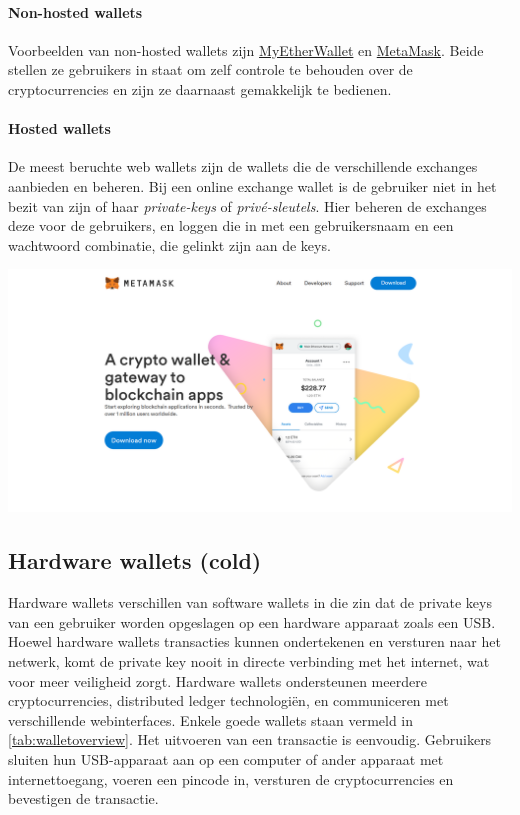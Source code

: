 \paragraph{Non-hosted wallets}
Voorbeelden van non-hosted wallets zijn \href{https://www.myetherwallet.com}{MyEtherWallet} en \href{https://www.metamask.io}{MetaMask}. Beide stellen ze gebruikers in staat om zelf controle te behouden over de cryptocurrencies en zijn ze daarnaast gemakkelijk te bedienen.

\paragraph{Hosted wallets}
De meest beruchte web wallets zijn de wallets die de verschillende exchanges aanbieden en beheren. Bij een online exchange wallet is de gebruiker niet in het bezit van zijn of haar \emph{private-keys} of \emph{priv{\'e}-sleutels}. Hier beheren de exchanges deze voor de gebruikers, en loggen die in met een gebruikersnaam en een wachtwoord combinatie, die gelinkt zijn aan de keys. 
\medskip

\begin{borderbox}
    \includegraphics[width=\textwidth]{img/ch-wallets/metamask.png}
\end{borderbox}

\subsection[Hardware wallets]{Hardware wallets (cold)} 
\label{subsec:hardware-wallets}
Hardware wallets verschillen van software wallets in die zin dat de private keys van een gebruiker worden opgeslagen op een hardware apparaat zoals een USB. Hoewel hardware wallets transacties kunnen ondertekenen en versturen naar het netwerk, komt de private key nooit in directe verbinding met het internet, wat voor meer veiligheid zorgt. Hardware wallets ondersteunen meerdere cryptocurrencies, distributed ledger technologi{\"e}n, en communiceren met verschillende webinterfaces. Enkele goede wallets staan vermeld in \cref{tab:walletoverview}. Het uitvoeren van een transactie is eenvoudig. Gebruikers sluiten hun USB-apparaat aan op een computer of ander apparaat met internettoegang, voeren een pincode in, versturen de cryptocurrencies en bevestigen de transactie. 

